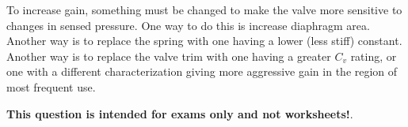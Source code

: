 \vskip 10pt

To increase gain, something must be changed to make the valve more sensitive to changes in sensed pressure.  One way to do this is increase diaphragm area.  Another way is to replace the spring with one having a lower (less stiff) constant.  Another way is to replace the valve trim with one having a greater $C_v$ rating, or one with a different characterization giving more aggressive gain in the region of most frequent use.







{\bf This question is intended for exams only and not worksheets!}.




